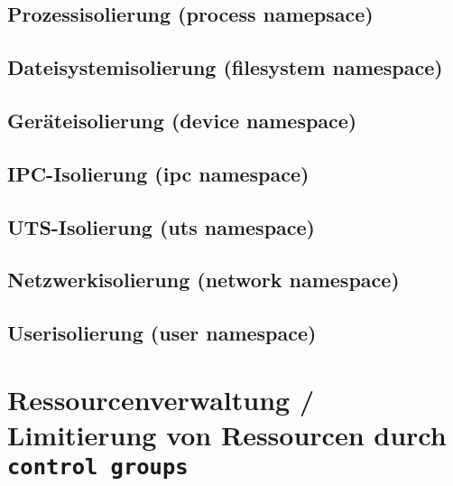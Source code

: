 \documentclass[../main.tex]{subfiles}
\begin{document}
		\subsection{Prozessisolierung (process namepsace)}
    \subsection{Dateisystemisolierung (filesystem namespace)}
    \subsection{Geräteisolierung (device namespace)}
    \subsection{IPC-Isolierung (ipc namespace)}
    \subsection{UTS-Isolierung (uts namespace)}
    \subsection{Netzwerkisolierung (network namespace)}
    \subsection{Userisolierung (user namespace)}
	\section{Ressourcenverwaltung / Limitierung von Ressourcen durch \texttt{control groups}}
  \label{secResLimit}

\end{document}
